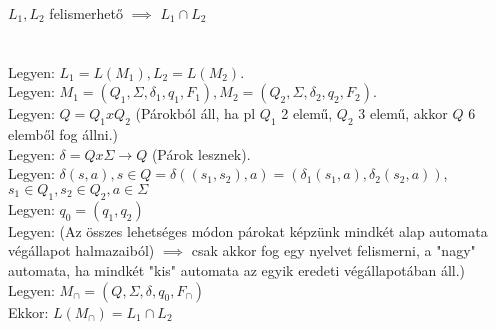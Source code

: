 \begin{frame}
\begin{tcolorbox}[title={Tétel: Felismerhető nyelvek metszete}]
$L_1, L_2$ felismerhető $\implies$ $L_1 \cap L_2$\\
\tcblower
\msmallskip
\underline{}\\
\mmedskip
\\
Legyen: $L_1 = L(M_1), L_2 = L(M_2)$.\\
Legyen: $M_1 = (Q_1, \Sigma , {\delta}_1, q_1, F_1), M_2 = (Q_2, \Sigma , {\delta}_2, q_2, F_2)$.\\
Legyen: $Q = Q_1 x Q_2$ (Párokból áll, ha pl $Q_1$ 2 elemű, $Q_2$ 3 elemű, akkor $Q$ 6 elemből fog állni.)\\
Legyen: $\delta = Q x \Sigma \rightarrow Q$ (Párok lesznek).\\
Legyen: $\delta(s, a), s \in Q = \delta((s_1, s_2), a) = ({\delta}_1(s_1, a), {\delta}_2(s_2, a))$, $s_1 \in Q_1, s_2 \in Q_2, a \in \Sigma$\\
\mbigskip
Legyen: $q_0 = (q_1, q_2)$\\
Legyen: \underline{} (Az összes lehetséges módon párokat képzünk mindkét alap automata végállapot halmazaiból) $\implies$ csak akkor fog egy nyelvet felismerni, a "nagy" automata, ha mindkét "kis" automata az egyik eredeti végállapotában áll.)\\
\msmallskip
Legyen: $M_{\cap} = (Q, \Sigma , \delta , q_0, F_{\cap})$\\
\mbigskip
Ekkor: \underline{$L(M_{\cap}) = L_1 \cap L_2$}\\
\end{tcolorbox}

\end{frame}

